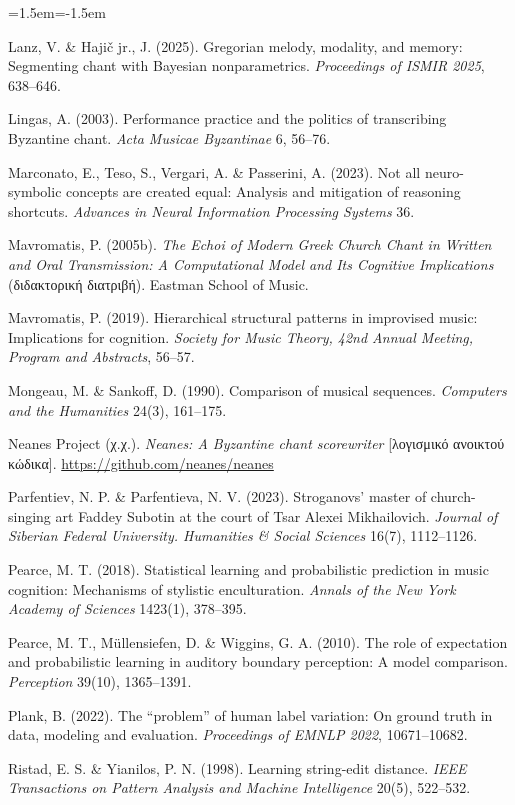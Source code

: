 \documentclass[11pt,a4paper]{article}
\begin{document}
\begin{list}{}{\leftmargin=1.5em\itemindent=-1.5em\itemsep=1pt}
\item Lanz, V. \& Hajič jr., J. (2025). Gregorian melody, modality, and memory: Segmenting chant with Bayesian nonparametrics. \emph{Proceedings of ISMIR 2025}, 638--646.
\item Lingas, A. (2003). Performance practice and the politics of transcribing Byzantine chant. \emph{Acta Musicae Byzantinae} 6, 56--76.
\item Marconato, E., Teso, S., Vergari, A. \& Passerini, A. (2023). Not all neuro-symbolic concepts are created equal: Analysis and mitigation of reasoning shortcuts. \emph{Advances in Neural Information Processing Systems} 36.
\item Mavromatis, P. (2005b). \emph{The Echoi of Modern Greek Church Chant in Written and Oral Transmission: A Computational Model and Its Cognitive Implications} (διδακτορική διατριβή). Eastman School of Music.
\item Mavromatis, P. (2019). Hierarchical structural patterns in improvised music: Implications for cognition. \emph{Society for Music Theory, 42nd Annual Meeting, Program and Abstracts}, 56--57.
\item Mongeau, M. \& Sankoff, D. (1990). Comparison of musical sequences. \emph{Computers and the Humanities} 24(3), 161--175.
\item Neanes Project (χ.χ.). \emph{Neanes: A Byzantine chant scorewriter} [λογισμικό ανοικτού κώδικα]. \url{https://github.com/neanes/neanes}
\item Parfentiev, N. P. \& Parfentieva, N. V. (2023). Stroganovs' master of church-singing art Faddey Subotin at the court of Tsar Alexei Mikhailovich. \emph{Journal of Siberian Federal University. Humanities \& Social Sciences} 16(7), 1112--1126.
\item Pearce, M. T. (2018). Statistical learning and probabilistic prediction in music cognition: Mechanisms of stylistic enculturation. \emph{Annals of the New York Academy of Sciences} 1423(1), 378--395.
\item Pearce, M. T., Müllensiefen, D. \& Wiggins, G. A. (2010). The role of expectation and probabilistic learning in auditory boundary perception: A model comparison. \emph{Perception} 39(10), 1365--1391.
\item Plank, B. (2022). The “problem” of human label variation: On ground truth in data, modeling and evaluation. \emph{Proceedings of EMNLP 2022}, 10671--10682.
\item Ristad, E. S. \& Yianilos, P. N. (1998). Learning string-edit distance. \emph{IEEE Transactions on Pattern Analysis and Machine Intelligence} 20(5), 522--532.

\end{list}
\end{document}
